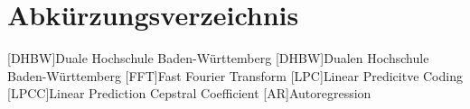\section*{Abkürzungsverzeichnis}
\begin{acronym}
  [DHBW]{Duale Hochschule Ba\-den-\-Würt\-tem\-berg}
  [DHBW]{Dualen Hochschule Ba\-den-\-Würt\-tem\-berg}
  [FFT]{Fast Fourier Transform}
  [LPC]{Linear Predicitve Coding}
  [LPCC]{Linear Prediction Cepstral Coefficient}
  [AR]{Autoregression}
\end{acronym}
\newpage